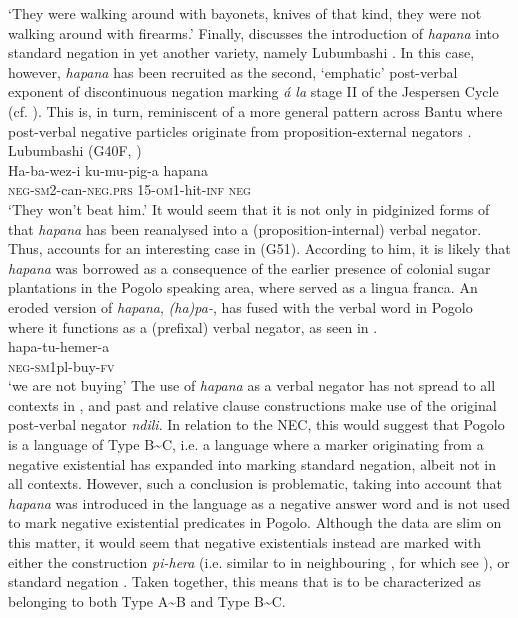 \documentclass[output=paper]{langscibook}
\begin{document}
\glt 	`They were walking around with bayonets, knives of that kind, they were not walking around with firearms.'
\z
%
Finally, \citet{Schicho1992} discusses the introduction of \textit{hapana}
into standard negation in yet another  variety, namely
Lubumbashi . In this case,
however, \textit{hapana} has been recruited as the second, `emphatic'
post-verbal exponent of discontinuous negation marking \textit{\'a la}
stage II of the Jespersen Cycle (cf. \citealt{Auwera2009}). This is, in
turn, reminiscent of a more general pattern across Bantu where post-verbal
negative particles originate from pro\-po\-si\-tion-ex\-ter\-nal negators
\parencite[see][]{DevosAuwera2013}.
%
\ea\label{ex:lubumbashi-beat}
Lubumbashi  (G40F, \citealt[84]{Schicho1992})\\
\gll Ha-ba-wez-i ku-mu-pig-a hapana\\
	\textsc{neg}-\textsc{sm}2-can-\textsc{neg.prs} 15-\textsc{om}1-hit-\textsc{inf} \textsc{neg}\\
\glt 	`They won't beat him.'
\z
%
It would seem that it is not only in pidginized forms of  that
\textit{hapana} has been reanalysed into a (proposition-internal) verbal
negator. Thus, \citet{Nurse2007} accounts for an interesting case in
 (G51). According to him, it is likely that \textit{hapana} was
borrowed as a consequence of the earlier presence of colonial sugar
plantations in the Pogolo speaking area, where  served as a lingua
franca. An eroded version of \textit{hapana}, \textit{(ha)pa-}, has fused
with the verbal word in Pogolo where it functions as a (prefixal) verbal
negator, as seen in .
%
\ea\label{ex:pogolo-buy}
\\
\gll hapa-tu-hemer-a\\
	\textsc{neg-sm}1pl-buy-\textsc{fv}\\
\glt 	`we are not buying'
\z
%
The use of \textit{hapana} as a verbal negator has not spread to all
contexts in , and past and relative clause constructions make use of the original post-verbal negator \textit{ndili}. In relation to the NEC, this would suggest that Pogolo is a language of Type B{\textasciitilde}C, i.e. a language where a marker originating from a negative existential has expanded into marking standard negation, albeit not in all contexts. However, such a conclusion is problematic, taking into account that \textit{hapana} was introduced in the language as a negative answer word and is not used to mark negative existential predicates in Pogolo. Although the data are slim on this matter, it would seem that negative existentials instead are marked with either the construction \textit{pi-hera} (i.e. similar to in neighbouring , for which see ), or standard negation \citep{Hendle1907}. Taken together, this means that  is to be characterized as belonging to both Type A{\textasciitilde}B and Type B{\textasciitilde}C.
\end{document}
